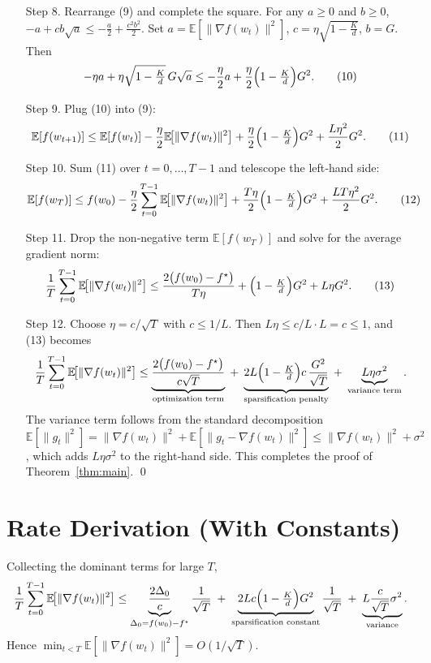\documentclass{article}
\newcommand{\E}{\mathbb{E}}
\begin{document}
\begin{enumerate}
\item[Step 8.] Rearrange (9) and complete the square. For any $a\ge0$ and $b\ge0$,
$-a + cb\sqrt{a}\le -\frac{a}{2}+ \frac{c^{2}b^{2}}{2}$.
Set $a=\E[\|\nabla f(w_{t})\|^{2}]$, $c=\eta\sqrt{1-\frac{K}{d}}$, $b=G$.
Then
\[
-\eta a + \eta\sqrt{1-\tfrac{K}{d}}\,G\sqrt{a}
\le -\frac{\eta}{2}a + \frac{\eta}{2}\Bigl(1-\tfrac{K}{d}\Bigr)G^{2}. \tag{10}
\]

\item[Step 9.] Plug (10) into (9):
\[
\E[f(w_{t+1})]\le \E[f(w_{t})]
-\frac{\eta}{2}\E\!\big[\|\nabla f(w_{t})\|^{2}\big]
+\frac{\eta}{2}\Bigl(1-\tfrac{K}{d}\Bigr)G^{2}
+\frac{L\eta^{2}}{2}G^{2}. \tag{11}
\]

\item[Step 10.] Sum (11) over $t=0,\dots,T-1$ and telescope the left‑hand side:
\[
\E[f(w_{T})]\le f(w_{0})
-\frac{\eta}{2}\sum_{t=0}^{T-1}\E\!\big[\|\nabla f(w_{t})\|^{2}\big]
+ \frac{T\eta}{2}\Bigl(1-\tfrac{K}{d}\Bigr)G^{2}
+\frac{LT\eta^{2}}{2}G^{2}. \tag{12}
\]

\item[Step 11.] Drop the non‑negative term $\E[f(w_{T})]$ and solve for the average gradient norm:
\[
\frac{1}{T}\sum_{t=0}^{T-1}\E\!\big[\|\nabla f(w_{t})\|^{2}\big]
\le \frac{2\big(f(w_{0})-f^{\star}\big)}{T\eta}
+ \Bigl(1-\tfrac{K}{d}\Bigr)G^{2}
+ L\eta G^{2}. \tag{13}
\]

\item[Step 12.] Choose $\eta = c/\sqrt{T}$ with $c\le 1/L$.
Then $L\eta\le c/L\cdot L = c\le 1$, and (13) becomes
\[
\frac{1}{T}\sum_{t=0}^{T-1}\E\!\big[\|\nabla f(w_{t})\|^{2}\big]
\le
\underbrace{\frac{2\big(f(w_{0})-f^{\star}\big)}{c\sqrt{T}}}_{\text{optimization term}}
\;+\;
\underbrace{2L\Bigl(1-\tfrac{K}{d}\Bigr)c\,\frac{G^{2}}{\sqrt{T}}}_{\text{sparsification penalty}}
\;+\;
\underbrace{L\eta\sigma^{2}}_{\text{variance term}} .
\]
The variance term follows from the standard decomposition
$\E[\|g_{t}\|^{2}]=\|\nabla f(w_{t})\|^{2}+\E[\|g_{t}-\nabla f(w_{t})\|^{2}]
\le \|\nabla f(w_{t})\|^{2}+\sigma^{2}$,
which adds $L\eta\sigma^{2}$ to the right‑hand side.
This completes the proof of Theorem~\ref{thm:main}. \qed
\end{enumerate}

\section*{Rate Derivation (With Constants)}
Collecting the dominant terms for large $T$,
\[
\frac{1}{T}\sum_{t=0}^{T-1}\E\!\big[\|\nabla f(w_{t})\|^{2}\big]
\le
\underbrace{\frac{2\Delta_{0}}{c}}_{\Delta_{0}=f(w_{0})-f^{\star}}
\frac{1}{\sqrt{T}}
\;+\;
\underbrace{2Lc\Bigl(1-\tfrac{K}{d}\Bigr)G^{2}}_{\text{sparsification constant}}
\frac{1}{\sqrt{T}}
\;+\;
\underbrace{L\frac{c}{\sqrt{T}}\sigma^{2}}_{\text{variance}} .
\]
Hence $\min_{t<T}\E[\|\nabla f(w_{t})\|^{2}]=O(1/\sqrt{T})$.
\end{document}
